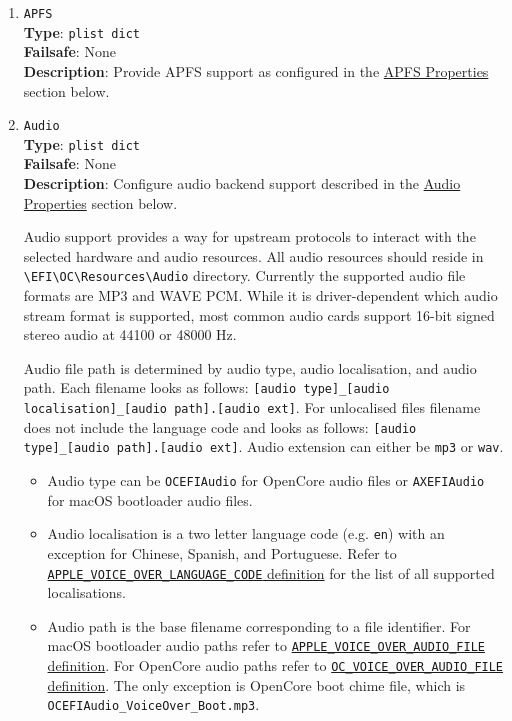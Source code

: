 \documentclass[]{article}
\providecommand{\tightlist}{%
  \setlength{\itemsep}{0pt}\setlength{\parskip}{0pt}}
\begin{document}
\begin{enumerate}
\item
  \texttt{APFS}\\
  \textbf{Type}: \texttt{plist\ dict}\\
  \textbf{Failsafe}: None\\
  \textbf{Description}: Provide APFS support as configured in the
  \hyperref[uefiapfsprops]{APFS Properties} section below.

\item
  \texttt{Audio}\\
  \textbf{Type}: \texttt{plist\ dict}\\
  \textbf{Failsafe}: None\\
  \textbf{Description}: Configure audio backend support described
  in the \hyperref[uefiaudioprops]{Audio Properties} section below.

  Audio support provides a way for upstream protocols to interact with the
  selected hardware and audio resources. All audio resources should reside
  in \texttt{\textbackslash EFI\textbackslash OC\textbackslash Resources\textbackslash Audio}
  directory. Currently the supported audio file formats are MP3 and WAVE PCM. While it is
  driver-dependent which audio stream format is supported, most common audio cards
  support 16-bit signed stereo audio at 44100 or 48000 Hz.

  Audio file path is determined by audio type, audio localisation, and audio path. Each filename
  looks as follows: \texttt{[audio type]\_[audio localisation]\_[audio path].[audio ext]}.
  For unlocalised files filename does not include the language code and looks as follows:
  \texttt{[audio type]\_[audio path].[audio ext]}. Audio extension can either be \texttt{mp3}
  or \texttt{wav}.

  \begin{itemize}
  \tightlist
  \item Audio type can be \texttt{OCEFIAudio} for OpenCore audio files or
    \texttt{AXEFIAudio} for macOS bootloader audio files.
  \item Audio localisation is a two letter language code (e.g. \texttt{en})
  with an exception for Chinese, Spanish, and Portuguese. Refer to
  \href{https://github.com/acidanthera/OpenCorePkg/blob/master/Include/Apple/Protocol/AppleVoiceOver.h}{\texttt{APPLE\_VOICE\_OVER\_LANGUAGE\_CODE} definition}
  for the list of all supported localisations.
  \item Audio path is the base filename corresponding to a file identifier. For macOS bootloader audio paths refer to
  \href{https://github.com/acidanthera/OpenCorePkg/blob/master/Include/Apple/Protocol/AppleVoiceOver.h}{\texttt{APPLE\_VOICE\_OVER\_AUDIO\_FILE} definition}.
  For OpenCore audio paths refer to
  \href{https://github.com/acidanthera/OpenCorePkg/blob/master/Include/Acidanthera/Protocol/OcAudio.h}{\texttt{OC\_VOICE\_OVER\_AUDIO\_FILE} definition}.
  The only exception is OpenCore boot chime file, which is \texttt{OCEFIAudio\_VoiceOver\_Boot.mp3}.
  \end{itemize}


\end{enumerate}
\end{document}
